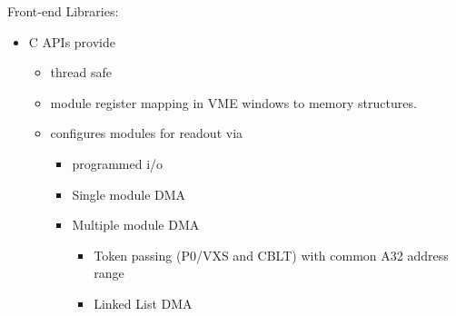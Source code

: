 Front-end Libraries:
\begin{itemize}
\item C APIs provide
  \begin{itemize}
  \item thread safe
  \item module register mapping in VME windows to memory structures.
  \item configures modules for readout via
    \begin{itemize}
    \item programmed i/o
    \item Single module DMA
    \item Multiple module DMA
       \begin{itemize}
       \item Token passing (P0/VXS and CBLT) with common A32 address range
       \item Linked List DMA
       \end{itemize}
    \end{itemize}
  \end{itemize}
\end{itemize}
